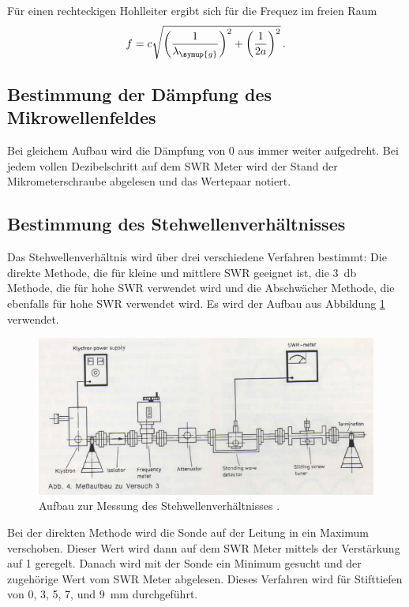 Für einen rechteckigen Hohlleiter ergibt sich für die Frequez im freien Raum
\begin{equation}
  f=c \sqrt{\left(\frac{1}{\lambda_{\symup{g}}}\right)^2+\left(\frac{1}{2a}\right)^2} \,.
\end{equation}

\subsection{Bestimmung der Dämpfung des Mikrowellenfeldes}
\label{subsec:dämpfung}
Bei gleichem Aufbau wird die Dämpfung von 0 aus immer weiter aufgedreht. Bei jedem
vollen Dezibelschritt auf dem SWR Meter wird der Stand der Mikrometerschraube
abgelesen und das Wertepaar notiert.


\subsection{Bestimmung des Stehwellenverhältnisses}
\label{subsec:swr}

Das Stehwellenverhältnis wird über drei verschiedene Verfahren bestimmt: Die direkte
Methode, die für kleine und mittlere SWR geeignet ist, die \SI{3}{\decibel} Methode, die für hohe
SWR verwendet wird und die Abschwächer Methode, die ebenfalls für hohe SWR verwendet
wird. Es wird der Aufbau aus Abbildung \ref{fig:aufbau_swr} verwendet.

\begin{figure}
  \centering
  \includegraphics[width=\textwidth]{data/aufbau_swr.png}
  \caption{Aufbau zur Messung des Stehwellenverhältnisses \cite{Versuchsanleitung_alt}.}
  \label{fig:aufbau_swr}
\end{figure}

Bei der
direkten Methode wird die Sonde auf der Leitung in ein Maximum verschoben. Dieser
Wert wird dann auf dem SWR Meter mittels der Verstärkung auf 1 geregelt. Danach
wird mit der Sonde ein Minimum gesucht und der zugehörige Wert vom SWR Meter
abgelesen. Dieses Verfahren wird für Stifttiefen von 0, 3, 5, 7, und \SI{9}{\milli\meter}
durchgeführt.

